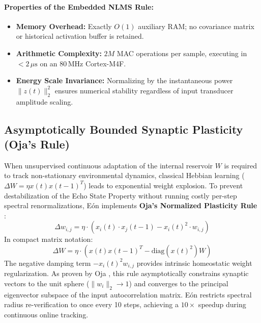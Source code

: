 \paragraph{Properties of the Embedded NLMS Rule:}
\begin{itemize}
    \item \textbf{Memory Overhead:} Exactly $O(1)$ auxiliary RAM; no covariance matrix or historical activation buffer is retained.
    \item \textbf{Arithmetic Complexity:} $2M$ MAC operations per sample, executing in $<2\,\mu\text{s}$ on an $80\,\text{MHz}$ Cortex-M4F.
    \item \textbf{Energy Scale Invariance:} Normalizing by the instantaneous power $\|z(t)\|_2^2$ ensures numerical stability regardless of input transducer amplitude scaling.
\end{itemize}

\subsection{Asymptotically Bounded Synaptic Plasticity (Oja's Rule)}
When unsupervised continuous adaptation of the internal reservoir $W$ is required to track non-stationary environmental dynamics, classical Hebbian learning ($\Delta W = \eta x(t) x(t-1)^T$) leads to exponential weight explosion. To prevent destabilization of the Echo State Property without running costly per-step spectral renormalizations, Eón implements \textbf{Oja's Normalized Plasticity Rule} \cite{oja1982simplified}:
\begin{equation}
    \Delta w_{i,j} = \eta \cdot \left( x_i(t) \cdot x_j(t-1) - x_i(t)^2 \cdot w_{i,j} \right)
    \label{eq:oja}
\end{equation}
In compact matrix notation:
\begin{equation}
    \Delta W = \eta \cdot \left( x(t) x(t-1)^T - \text{diag}(x(t)^2) W \right)
\end{equation}
The negative damping term $-x_i(t)^2 w_{i,j}$ provides intrinsic homeostatic weight regularization. As proven by Oja \cite{oja1982simplified}, this rule asymptotically constrains synaptic vectors to the unit sphere ($\|w_i\|_2 \to 1$) and converges to the principal eigenvector subspace of the input autocorrelation matrix. Eón restricts spectral radius re-verification to once every 10 steps, achieving a $10\times$ speedup during continuous online tracking.


